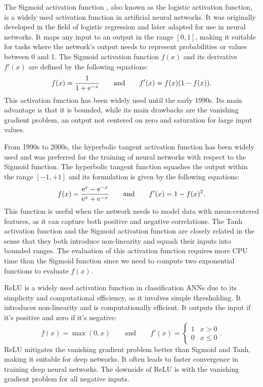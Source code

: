 \documentclass[algorithms,article,submit,pdftex,moreauthors]{Definitions/mdpi}
\DeclareRobustCommand{\e}[1]{{\rm e}^{#1}}
\begin{document}
The Sigmoid activation function \cite{Han-1995-ISF}, also known as the logistic activation function, is a widely used activation function in artificial neural networks. 
It was originally developed in the field of logistic regression and later adapted for use in neural networks. 
It maps any input to an output in the range $[0,1]$, making it suitable for tasks where the network's output needs to represent probabilities or values between 0 and 1.
The Sigmoid  activation function $f(x)$ and its derivative $f'(x)$ are defined by the following equations:
\begin{equation}
f(x) = \frac{1}{1+\e{-x}}\qquad \text{and}\qquad f'(x) = f(x)\left(1-f(x)\right).\label{eq:act-sig}
\end{equation}
This activation function has been widely used until the early 1990s.
Its main advantage is that it is bounded, while its main drawbacks are the vanishing gradient problem, an output not centered on zero and saturation for large input values.

From 1990s to 2000s, the hyperbolic tangent activation function has been widely used and was preferred for the training of neural networks with respect to the Sigmoid function.
The  hyperbolic tangent function squashes the output within the range $[-1,+1]$ and its formulation is given by the following equations:
\begin{equation}
f(x) = \frac{\e{x} - \e{-x}}{\e{x} + \e{-x}}\qquad \text{and}\qquad f'(x) = 1 - f(x)^2.\label{eq:act-tanh}
\end{equation}
This function is useful when the network needs to model data with mean-centered features, as it can capture both positive and negative correlations.
The Tanh activation function and the Sigmoid activation function are closely related in the sense that they both introduce non-linearity and squash their inputs into bounded ranges.
The evaluation of this activation function requires more CPU time than the Sigmoid function since we need to compute two exponential functions to evaluate $f(x)$.

ReLU is a widely used activation function in classification ANNs due to its simplicity and computational efficiency, as it involves simple thresholding. It introduces non-linearity and is computationally efficient. It outputs the input if it's positive and zero if it's negative:
\begin{equation}
f(x) = \max(0,x)\qquad \text{and}\qquad f'(x) =
\begin{cases}
1&x>0\\
0&x\le 0
\end{cases}.\label{eq:act-relu}
\end{equation}
ReLU mitigates the vanishing gradient problem better than Sigmoid and Tanh, making it suitable for deep networks.
It often leads to faster convergence in training deep neural networks.
The downside of ReLU is with the vanishing gradient problem for all negative inputs.
\end{document}
